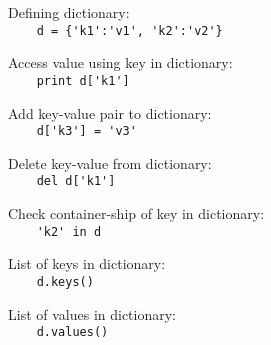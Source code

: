 Defining dictionary:\\
{\ex \lstinline|    d = {'k1':'v1', 'k2':'v2'}|}

Access value using key in dictionary:\\
{\ex \lstinline|    print d['k1']|}

Add key-value pair to dictionary:\\
{\ex \lstinline|    d['k3'] = 'v3'|}

Delete key-value from dictionary:\\
{\ex \lstinline|    del d['k1']|}

Check container-ship of key in dictionary:\\
{\ex \lstinline|    'k2' in d|}

List of keys in dictionary:\\
{\ex \lstinline|    d.keys()|}

List of values in dictionary:\\
{\ex \lstinline|    d.values()|}
